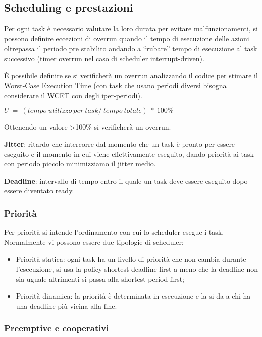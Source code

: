 \subsection{Scheduling e prestazioni}\label{scheduling-e-prestazioni}

Per ogni task è necessario valutare la loro durata per evitare
malfunzionamenti, si possono definire eccezioni di overrun quando il
tempo di esecuzione delle azioni oltrepassa il periodo pre stabilito
andando a ``rubare'' tempo di esecuzione al task successivo (timer
overrun nel caso di scheduler interrupt-driven).

È possibile definire se si verificherà un overrun analizzando il codice
per stimare il Worst-Case Execution Time (con task che usano periodi
diversi bisogna considerare il WCET con degli iper-periodi).

\(U\  = \ (tempo\ utilizzo\ per\ task/\ tempo\ totale)\ *\ 100\%\)

Ottenendo un valore \textgreater100\% si verificherà un overrun.

\textbf{Jitter}: ritardo che intercorre dal momento che un task è pronto
per essere eseguito e il momento in cui viene effettivamente eseguito,
dando priorità ai task con periodo piccolo minimizziamo il jitter medio.

\textbf{Deadline}: intervallo di tempo entro il quale un task deve
essere eseguito dopo essere diventato ready.

\subsubsection{Priorità}\label{priorituxe0}

Per priorità si intende l'ordinamento con cui lo scheduler esegue i
task. Normalmente vi possono essere due tipologie di scheduler:

\begin{itemize}
\item
  Priorità statica: ogni task ha un livello di priorità che non cambia
  durante l'esecuzione, si usa la policy shortest-deadline first a meno
  che la deadline non sia uguale altrimenti si passa alla
  shortest-period first;
\item
  Priorità dinamica: la priorità è determinata in esecuzione e la si da
  a chi ha una deadline più vicina alla fine.
\end{itemize}

\subsubsection{Preemptive e cooperativi}\label{preemptive-e-cooperativi}

